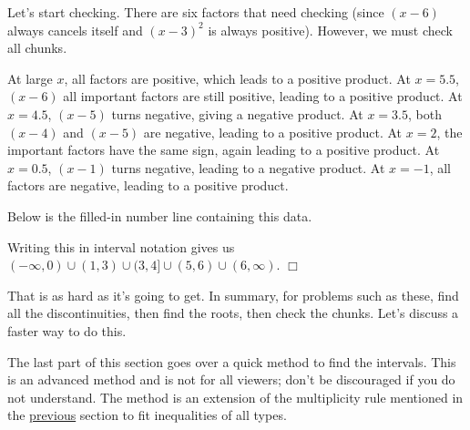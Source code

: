 \documentclass[lang=en,11pt]{elegantbook}
\begin{document}
\begin{solution}
Let's start checking.  There are six factors that need checking (since $(x-6)$ always cancels itself and $(x-3)^2$ is always positive).  However, we must check all chunks.

At large $x$, all factors are positive, which leads to a positive product.  At $x=5.5$, $(x-6)$ all important factors are still positive, leading to a positive product.  At $x=4.5$, $(x-5)$ turns negative, giving a negative product.  At $x=3.5$, both $(x-4)$ and $(x-5)$ are negative, leading to a positive product.  At $x=2$, the important factors have the same sign, again leading to a positive product.  At $x=0.5$, $(x-1)$ turns negative, leading to a negative product.  At $x=-1$, all factors are negative, leading to a positive product.

Below is the filled-in number line containing this data.

\begin{figure}[!h]
    \centering
\end{figure}

Writing this in interval notation gives us $(-\infty,0)\cup(1,3)\cup(3,4]\cup(5,6)\cup(6,\infty)$. $\Box$
\end{solution}

\noindent That is as hard as it's going to get.  In summary, for problems such as these, find all the discontinuities, then find the roots, then check the chunks.  Let's discuss a faster way to do this.

The last part of this section goes over a quick method to find the intervals.  This is an advanced method and is not for all viewers; don't be discouraged if you do not understand.  The method is an extension of the multiplicity rule mentioned in the \hyperlink{section.14.2}{previous} section to fit inequalities of all types.
\end{document}
